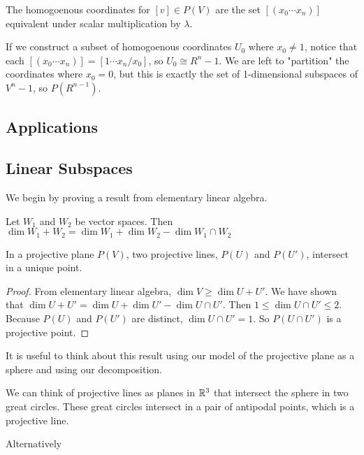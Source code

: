 \documentclass[10pt]{article}
\begin{document}
\begin{definition}
	The homogoenous coordinates for $[v] \in P(V)$ are the set $[(x_0 \cdots x_n)]$ equivalent under scalar multiplication by $\lambda$.
\end{definition}

If we construct a subset of homogoenous coordinates $U_0$ where $x_0 \neq 1$,
notice that each $[(x_0 \cdots x_n)] = [1 \cdots x_n / x_0]$, so $U_0 \cong
R^n-1$. We are left to "partition" the coordinates where $x_0 = 0$, but this is
exactly the set of 1-dimensional subspaces of $V^n-1$, so $P(R^{n-1})$.

\subsection{Applications}


\subsection{Linear Subspaces}

We begin by proving a result from elementary linear algebra.


\begin{theorem}
	Let $W_1$ and $W_2$ be vector spaces. Then $\dim W_1 + W_2 = \dim W_1 + \dim W_2 - \dim W_1 \cap W_2$ 
\end{theorem}

\begin{theorem}
	In a projective plane $P(V)$, two projective lines, $P(U)$ and $P(U')$, intersect in a unique point.
\end{theorem}
\begin{proof}
	From elementary linear algebra, $\dim V \geq \dim U + U'$. We have shown that $\dim U + U' = \dim U + \dim U' - \dim {U \cap U'}$.
	Then $1 \leq \dim {U \cap U'} \leq 2$. Because $P(U)$ and $P(U')$ are distinct, $\dim {U \cap U'} = 1$. So $P(U \cap U')$ is a projective point.
\end{proof}

It is useful to think about this result using our model of the projective plane as a sphere and using our decomposition.

We can think of projective lines as planes in $\mathbb{R}^3$ that intersect the sphere
in two great circles. These great circles intersect in a pair of antipodal
points, which is a projective line.

Alternatively
\end{document}
